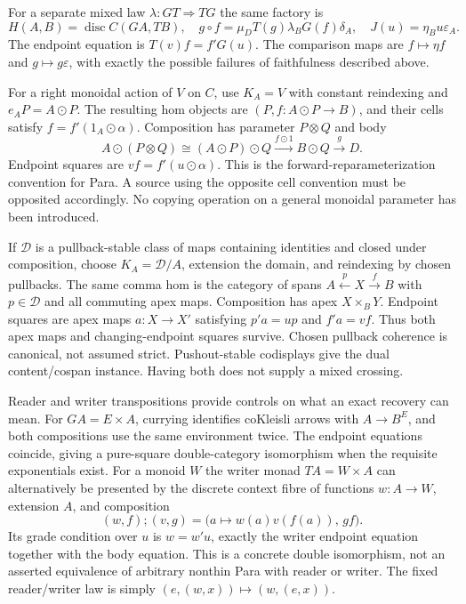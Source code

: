 \documentclass[11pt]{article}
\theoremstyle{definition}
\newcommand{\disc}{\operatorname{disc}}
\newcommand{\then}{\mathbin{;}}
\begin{document}
For a separate mixed law $\lambda:GT\Rightarrow TG$ the same factory is
\begin{equation}\label{eq:fixedmixed}
 H(A,B)=\disc C(GA,TB),\quad
 g\circ f=\mu_D T(g)\lambda_B G(f)\delta_A,\quad
 J(u)=\eta_Bu\varepsilon_A.
\end{equation}
The endpoint equation is $T(v)f=f'G(u)$. The comparison maps are $f\mapsto
\eta f$ and $g\mapsto g\varepsilon$, with exactly the possible failures of
faithfulness described above.

For a right monoidal action of $V$ on $C$, use $K_A=V$ with constant
reindexing and $e_AP=A\mathbin{\odot}P$. The resulting hom objects are
$(P,f:A\odot P\to B)$, and their cells satisfy
$f=f'(1_A\odot\alpha)$. Composition has parameter $P\otimes Q$ and body
\[
 A\odot(P\otimes Q)\cong(A\odot P)\odot Q
 \xrightarrow{f\odot1}B\odot Q\xrightarrow{g}D.
\]
Endpoint squares are $vf=f'(u\odot\alpha)$. This is the
forward-reparameterization convention for Para. A source using the opposite
cell convention must be opposited accordingly. No copying operation on a
general monoidal parameter has been introduced.

If $\mathcal D$ is a pullback-stable class of maps containing identities and
closed under composition, choose $K_A=\mathcal D/A$, extension the domain,
and reindexing by chosen pullbacks. The same comma hom is the category of
spans $A\xleftarrow{p}X\xrightarrow{f}B$ with $p\in\mathcal D$ and all
commuting apex maps. Composition has apex $X\times_BY$. Endpoint squares are
apex maps $a:X\to X'$ satisfying $p'a=up$ and $f'a=vf$. Thus both apex maps
and changing-endpoint squares survive. Chosen pullback coherence is
canonical, not assumed strict. Pushout-stable codisplays give the dual
content/cospan instance. Having both does not supply a mixed crossing.

Reader and writer transpositions provide controls on what an exact recovery
can mean. For $GA=E\times A$, currying identifies coKleisli arrows with
$A\to B^E$, and both compositions use the same environment twice. The
endpoint equations coincide, giving a pure-square double-category
isomorphism when the requisite exponentials exist. For a monoid $W$ the
writer monad $TA=W\times A$ can alternatively be presented by the discrete
context fibre of functions $w:A\to W$, extension $A$, and composition
\[
 (w,f)\then(v,g)=\bigl(a\mapsto w(a)v(f(a)),\,gf\bigr).
\]
Its grade condition over $u$ is $w=w'u$, exactly the writer endpoint
equation together with the body equation. This is a concrete double
isomorphism, not an asserted equivalence of arbitrary nonthin Para with
reader or writer. The fixed reader/writer law is simply
$(e,(w,x))\mapsto(w,(e,x))$.
\end{document}
